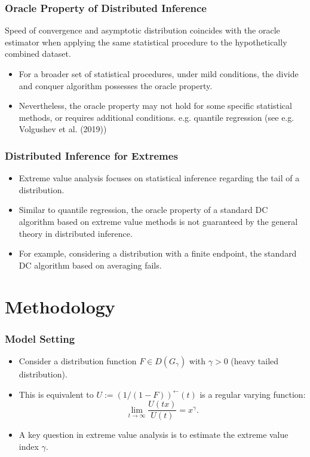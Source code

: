 \documentclass{beamer}
\begin{document}
\begin{frame}
    \frametitle{Oracle Property of Distributed Inference}
\begin{definition}
    Speed of convergence and asymptotic distribution coincides with the oracle estimator when applying the same statistical procedure to the hypothetically
    combined dataset.
\end{definition}
    
\bigskip
\begin{itemize}
    \item For a broader set of statistical procedures, under mild conditions, the divide and conquer algorithm possesses the oracle property.
    \item Nevertheless, the oracle property may not hold for some specific statistical
    methods, or requires additional conditions. e.g. quantile regression (see e.g. Volgushev et al. (2019))
\end{itemize}

\end{frame}


\begin{frame}
    \frametitle{Distributed Inference for Extremes} 
    \begin{itemize}
        \item Extreme value analysis focuses on statistical inference regarding the tail of a distribution.
        \bigskip
        \item    Similar to quantile regression, the oracle property of a standard DC algorithm based on extreme
        value methods is not guaranteed by the general theory in distributed inference.
        \bigskip
        \item For example,
        considering a distribution with a finite endpoint, the standard DC algorithm based on averaging fails.
    \end{itemize}
\end{frame}


\section{Methodology}

\begin{frame}
    \frametitle{Model Setting}
    \begin{itemize}
        \item Consider a distribution function $F \in D(G_{\gamma})$ with $\gamma>0$ (heavy tailed distribution). 
        \bigskip
        \item  This is equivalent to $U:=(1/(1-F))^{\leftarrow}(t)$ is a regular varying function:
        $$
        \lim_{t\to \infty}\frac{U(tx)}{U(t)} = x^{\gamma}.
        $$
        \bigskip
        \item A key question in extreme value analysis is to estimate the extreme value index $\gamma$.
    \end{itemize}
\end{frame}
\end{document}
